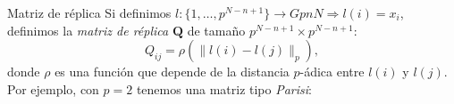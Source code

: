 \documentclass{beamer}
\theoremstyle{definition}
\numberwithin{equation}{section}
\newcommand{\tit}[1]{\textit{#1}}
\newcommand{\pnorm}[1]{\|#1\|_p}
\begin{document}
\begin{frame}{Matriz de réplica}
 Si definimos $l\colon\{1,\dots,p^{N-n+1}\}\to GpnN \Rightarrow l(i)=x_i$,
 definimos la \tit{matriz de réplica} $\textbf{Q} $ de tamaño $p^{N-n+1}\times p^{N-n+1}$: $$Q_{ij}=\rho(\pnorm{l(i)-l(j)}),$$ 
 donde $\rho$ es una función que depende de la distancia $p$-ádica entre $l(i)$ y $l(j)$. Por ejemplo, con $p=2$ tenemos una matriz tipo \tit{Parisi}:
 \begin{center}	
 \end{center}
 

\end{frame}
\end{document}
